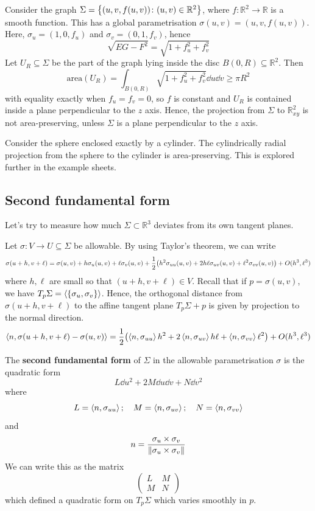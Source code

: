 \documentclass[a4paper]{article}
\begin{document}
\begin{example}
	Consider the graph \( \Sigma = \qty{(u,v,f(u,v)) \colon (u,v) \in \mathbb R^2} \), where \( f \colon \mathbb R^2 \to \mathbb R \) is a smooth function.
	This has a global parametrisation \( \sigma(u,v) = (u,v,f(u,v)) \).
	Here, \( \sigma_u = (1,0,f_u) \) and \( \sigma_v = (0,1,f_v) \), hence
	\[
		\sqrt{EG - F^2} = \sqrt{1+f_u^2+f_v^2}
	\]
	Let \( U_R \subseteq \Sigma \) be the part of the graph lying inside the disc \( B(0,R) \subseteq \mathbb R^2 \).
	Then
	\[
		\mathrm{area}(U_R) = \int_{B(0,R)} \sqrt{1+f_u^2+f_v^2} \dd{u}\dd{v} \geq \pi R^2
	\]
	with equality exactly when \( f_u = f_v = 0 \), so \( f \) is constant and \( U_R \) is contained inside a plane perpendicular to the \( z \) axis.
	Hence, the projection from \( \Sigma \) to \( \mathbb R^2_{xy} \) is not area-preserving, unless \( \Sigma \) is a plane perpendicular to the \( z \) axis.
\end{example}
\begin{example}
	Consider the sphere enclosed exactly by a cylinder.
	The cylindrically radial projection from the sphere to the cylinder is area-preserving.
	This is explored further in the example sheets.
\end{example}

\subsection{Second fundamental form}
Let's try to measure how much $ \Sigma \subset \mathbb{R}^{3} $ deviates from its own tangent planes. 

Let \( \sigma \colon V \to U \subseteq \Sigma \) be allowable.
By using Taylor's theorem, we can write
\[
	\sigma(u+h,v+\ell) = \sigma(u,v) + h \sigma_u(u,v) + \ell \sigma_v(u,v) + \frac{1}{2} \qty(h^2 \sigma_{uu}(u,v) + 2h\ell \sigma_{uv}(u,v) + \ell^2 \sigma_{vv}(u,v)) + O(h^3,\ell^3)
\]
where \( h,\ell \) are small so that \( (u+h,v+\ell) \in V \).
Recall that if \( p = \sigma(u,v) \), we have \( T_p \Sigma = \left\langle{} \qty{\sigma_u,\sigma_v} \right\rangle \).
Hence, the orthogonal distance from \( \sigma(u+h,v+\ell) \) to the affine tangent plane \( T_p \Sigma + p \) is given by projection to the normal direction.
\[
	\left\langle{n,\sigma(u+h,v+\ell) - \sigma(u,v)}\right\rangle = \frac{1}{2} \qty(\left\langle{n,\sigma_{uu}}\right\rangle h^2 + 2\left\langle{n,\sigma_{uv}}\right\rangle h\ell + \left\langle{n,\sigma_{vv}}\right\rangle\ell^2) + O(h^3,\ell^3)
\]

\begin{definition}
	The \textbf{second fundamental form} of \( \Sigma \) in the allowable parametrisation \( \sigma \) is the quadratic form
	\[
		L \dd{u}^2 + 2 M \dd{u} \dd{v} + N \dd{v}^2
	\]
	where
	\[
		L = \left\langle{n,\sigma_{uu}}\right\rangle;\quad M = \left\langle{n,\sigma_{uv}}\right\rangle;\quad N = \left\langle{n,\sigma_{vv}}\right\rangle
	\]
	and
	\[
		n = \frac{\sigma_u \times \sigma_v}{\norm{\sigma_u \times \sigma_v}}
	\]
	We can write this as the matrix
	\[
		\begin{pmatrix}
			L & M \\
			M & N
		\end{pmatrix}
	\]
	which defined a quadratic form on \( T_p \Sigma \) which varies smoothly in \( p \).
\end{definition}
\end{document}

